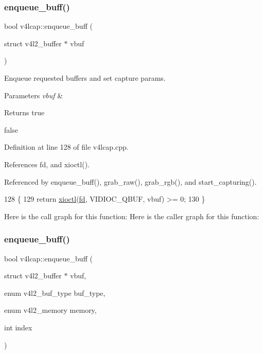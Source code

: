 \subsubsection{\texorpdfstring{enqueue\+\_\+buff()}{enqueue\_buff()}\hspace{0.1cm}{\footnotesize\ttfamily [1/3]}}
{\footnotesize\ttfamily bool v4lcap\+::enqueue\+\_\+buff (\begin{DoxyParamCaption}\item[{struct v4l2\+\_\+buffer $\ast$}]{vbuf }\end{DoxyParamCaption})}



Enqueue requested buffers and set capture params. 


\begin{DoxyParams}{Parameters}
{\em vbuf} & \\
\hline
\end{DoxyParams}
\begin{DoxyReturn}{Returns}
true 

false 
\end{DoxyReturn}


Definition at line 128 of file v4lcap.\+cpp.



References fd, and xioctl().



Referenced by enqueue\+\_\+buff(), grab\+\_\+raw(), grab\+\_\+rgb(), and start\+\_\+capturing().


\begin{DoxyCode}
128                                                    \{
129     \textcolor{keywordflow}{return} \hyperlink{classv4lcap_ab5aaa5a8c0df17f5ca57e0b5170232cb}{xioctl}(\hyperlink{classv4lcap_a38109593bde997dad13b3a461569573d}{fd}, VIDIOC\_QBUF, vbuf) >= 0;
130 \}
\end{DoxyCode}
Here is the call graph for this function\+:
Here is the caller graph for this function\+:
\mbox{\label{classv4lcap_acf3b811bf1d1db9842fef40e930813d7}} 
\subsubsection{\texorpdfstring{enqueue\+\_\+buff()}{enqueue\_buff()}\hspace{0.1cm}{\footnotesize\ttfamily [2/3]}}
{\footnotesize\ttfamily bool v4lcap\+::enqueue\+\_\+buff (\begin{DoxyParamCaption}\item[{struct v4l2\+\_\+buffer $\ast$}]{vbuf,  }\item[{enum v4l2\+\_\+buf\+\_\+type}]{buf\+\_\+type,  }\item[{enum v4l2\+\_\+memory}]{memory,  }\item[{int}]{index }\end{DoxyParamCaption})}



